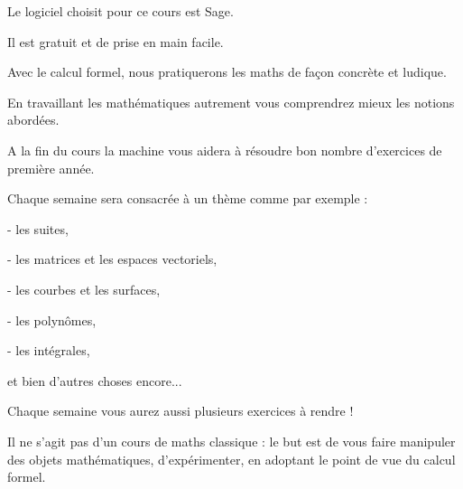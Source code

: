 



\change


Le logiciel choisit pour ce cours est Sage.

Il est gratuit et de prise en main facile.


Avec le calcul formel, nous pratiquerons les maths de façon concrète et ludique.

En travaillant les mathématiques autrement vous comprendrez mieux les notions abordées.

A la fin du cours la machine vous aidera à résoudre bon nombre d'exercices de première année.

%
%
%
%
%

\change

Chaque semaine sera consacrée à un thème comme par exemple :

- les suites,

\change

- les matrices et les espaces vectoriels,

\change

- les courbes et les surfaces,

\change

- les polynômes,

\change


- les intégrales,

et bien d'autres choses encore...

\change


Chaque semaine vous aurez aussi plusieurs exercices à rendre ! 

\change
 
Il ne s'agit pas d'un cours de maths classique : le but est de vous faire manipuler des objets mathématiques, 
d'expérimenter, en adoptant le point de vue du calcul formel.

